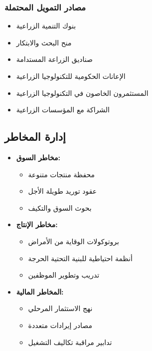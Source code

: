 \subsubsection{مصادر التمويل المحتملة}
\begin{itemize}
    \item بنوك التنمية الزراعية
    \item منح البحث والابتكار
    \item صناديق الزراعة المستدامة
    \item الإعانات الحكومية للتكنولوجيا الزراعية
    \item المستثمرون الخاصون في التكنولوجيا الزراعية
    \item الشراكة مع المؤسسات الزراعية
\end{itemize}

\subsection{إدارة المخاطر}
\begin{itemize}
    \item \textbf{مخاطر السوق:}
    \begin{itemize}
        \item محفظة منتجات متنوعة
        \item عقود توريد طويلة الأجل
        \item بحوث السوق والتكيف
    \end{itemize}
    
    \item \textbf{مخاطر الإنتاج:}
    \begin{itemize}
        \item بروتوكولات الوقاية من الأمراض
        \item أنظمة احتياطية للبنية التحتية الحرجة
        \item تدريب وتطوير الموظفين
    \end{itemize}
    
    \item \textbf{المخاطر المالية:}
    \begin{itemize}
        \item نهج الاستثمار المرحلي
        \item مصادر إيرادات متعددة
        \item تدابير مراقبة تكاليف التشغيل
    \end{itemize}
\end{itemize}

